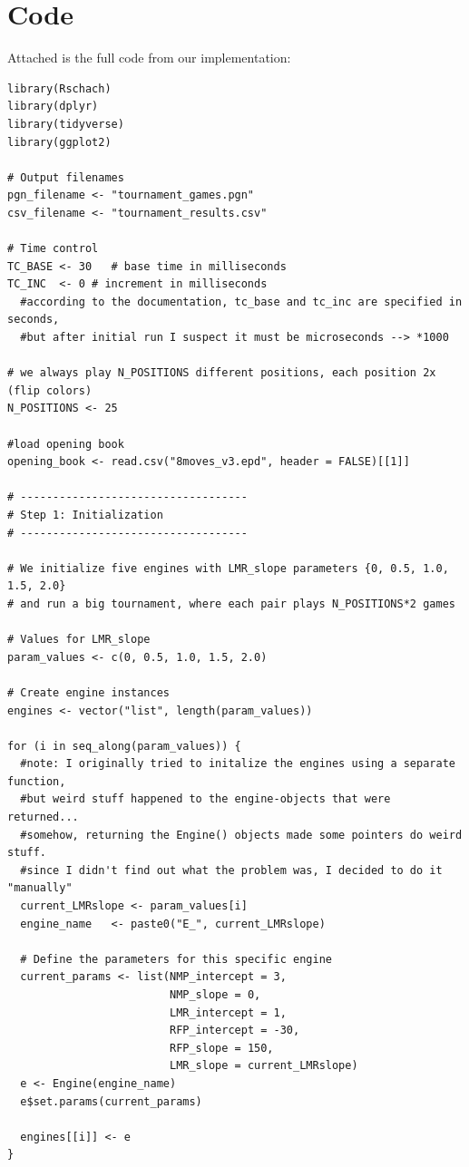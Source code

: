 \documentclass{article}
\begin{document}
\section{Code}
Attached is the full code from our implementation:
\begin{verbatim}
library(Rschach)
library(dplyr)
library(tidyverse)
library(ggplot2)

# Output filenames
pgn_filename <- "tournament_games.pgn"
csv_filename <- "tournament_results.csv"

# Time control
TC_BASE <- 30   # base time in milliseconds
TC_INC  <- 0 # increment in milliseconds
  #according to the documentation, tc_base and tc_inc are specified in seconds,
  #but after initial run I suspect it must be microseconds --> *1000

# we always play N_POSITIONS different positions, each position 2x (flip colors)
N_POSITIONS <- 25 

#load opening book
opening_book <- read.csv("8moves_v3.epd", header = FALSE)[[1]]

# -----------------------------------
# Step 1: Initialization
# -----------------------------------

# We initialize five engines with LMR_slope parameters {0, 0.5, 1.0, 1.5, 2.0}
# and run a big tournament, where each pair plays N_POSITIONS*2 games

# Values for LMR_slope
param_values <- c(0, 0.5, 1.0, 1.5, 2.0)

# Create engine instances
engines <- vector("list", length(param_values))

for (i in seq_along(param_values)) {
  #note: I originally tried to initalize the engines using a separate function,
  #but weird stuff happened to the engine-objects that were returned...
  #somehow, returning the Engine() objects made some pointers do weird stuff.
  #since I didn't find out what the problem was, I decided to do it "manually"
  current_LMRslope <- param_values[i]
  engine_name   <- paste0("E_", current_LMRslope)
  
  # Define the parameters for this specific engine
  current_params <- list(NMP_intercept = 3,
                         NMP_slope = 0,
                         LMR_intercept = 1,
                         RFP_intercept = -30,
                         RFP_slope = 150,
                         LMR_slope = current_LMRslope)
  e <- Engine(engine_name)
  e$set.params(current_params)
  
  engines[[i]] <- e
}


\end{verbatim}
\end{document}
